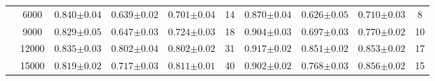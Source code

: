 \begin{table}[hbtp]
\begin{tabularx}{\textwidth}{cc | YYYc | YYYc }
        & 6000 & $0.840{\scriptscriptstyle\pm0.04}$ & $0.639{\scriptscriptstyle\pm0.02}$ & $0.701{\scriptscriptstyle\pm0.04}$ & 14 & $0.870{\scriptscriptstyle\pm0.04}$ & $0.626{\scriptscriptstyle\pm0.05}$ & $0.710{\scriptscriptstyle\pm0.03}$ & 8\\
        & 9000 & $0.829{\scriptscriptstyle\pm0.05}$ & $0.647{\scriptscriptstyle\pm0.03}$ & $0.724{\scriptscriptstyle\pm0.03}$ & 18 & $0.904{\scriptscriptstyle\pm0.03}$ & $0.697{\scriptscriptstyle\pm0.03}$ & $0.770{\scriptscriptstyle\pm0.02}$ & 10\\
        & 12000 & $0.835{\scriptscriptstyle\pm0.03}$ & $0.802{\scriptscriptstyle\pm0.04}$ & $0.802{\scriptscriptstyle\pm0.02}$ & 31 & $0.917{\scriptscriptstyle\pm0.02}$ & $0.851{\scriptscriptstyle\pm0.02}$ & $0.853{\scriptscriptstyle\pm0.02}$ & 17\\
        & 15000 & $0.819{\scriptscriptstyle\pm0.02}$ & $0.717{\scriptscriptstyle\pm0.03}$ & $0.811{\scriptscriptstyle\pm0.01}$ & 40 & $0.902{\scriptscriptstyle\pm0.02}$ & $0.768{\scriptscriptstyle\pm0.03}$ & $0.856{\scriptscriptstyle\pm0.02}$ & 15\\


\end{tabularx}
\end{table}
